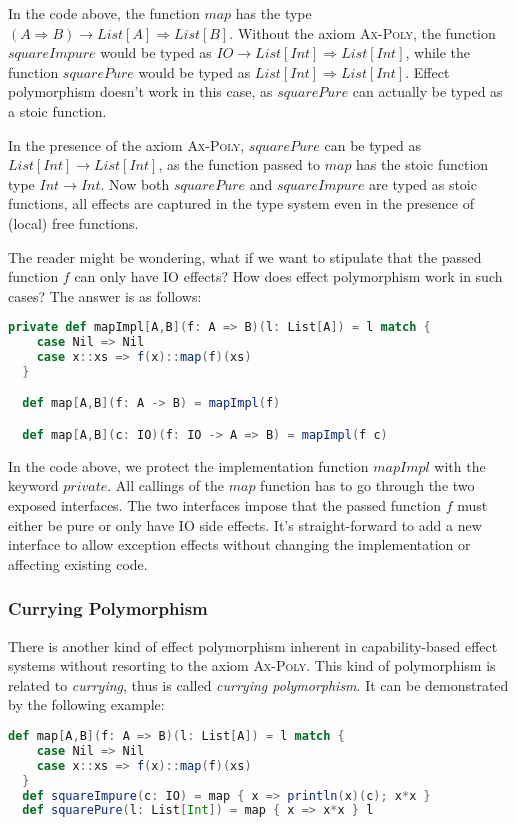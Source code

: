 In the code above, the function $map$ has the type
$(A \Rightarrow B) \to List[A] \Rightarrow List[B]$. Without the axiom
\textsc{Ax-Poly}, the function $squareImpure$ would be typed as
$IO \to List[Int] \Rightarrow List[Int]$, while the function
$squarePure$ would be typed as $List[Int] \Rightarrow List[Int]$.
Effect polymorphism doesn't work in this case, as $squarePure$ can
actually be typed as a stoic function.

In the presence of the axiom \textsc{Ax-Poly}, $squarePure$ can be
typed as $List[Int] \to List[Int]$, as the function passed to $map$
has the stoic function type $Int \to Int$. Now both $squarePure$ and
$squareImpure$ are typed as stoic functions, all effects are captured
in the type system even in the presence of (local) free functions.

The reader might be wondering, what if we want to stipulate that the
passed function $f$ can only have IO effects? How does effect
polymorphism work in such cases? The answer is as follows:

\begin{lstlisting}[language=Scala]
  private def mapImpl[A,B](f: A => B)(l: List[A]) = l match {
    case Nil => Nil
    case x::xs => f(x)::map(f)(xs)
  }

  def map[A,B](f: A -> B) = mapImpl(f)

  def map[A,B](c: IO)(f: IO -> A => B) = mapImpl(f c)
\end{lstlisting}

In the code above, we protect the implementation function $mapImpl$
with the keyword $private$.  All callings of the $map$ function has to
go through the two exposed interfaces. The two interfaces impose that
the passed function $f$ must either be pure or only have IO side
effects. It's straight-forward to add a new interface to allow
exception effects without changing the implementation or affecting
existing code.

\subsubsection{Currying Polymorphism}

There is another kind of effect polymorphism inherent in
capability-based effect systems without resorting to the axiom
\textsc{Ax-Poly}. This kind of polymorphism is related to
\emph{currying}, thus is called \emph{currying polymorphism}. It can
be demonstrated by the following example:

\begin{lstlisting}[language=Scala]
  def map[A,B](f: A => B)(l: List[A]) = l match {
    case Nil => Nil
    case x::xs => f(x)::map(f)(xs)
  }
  def squareImpure(c: IO) = map { x => println(x)(c); x*x }
  def squarePure(l: List[Int]) = map { x => x*x } l
\end{lstlisting}

